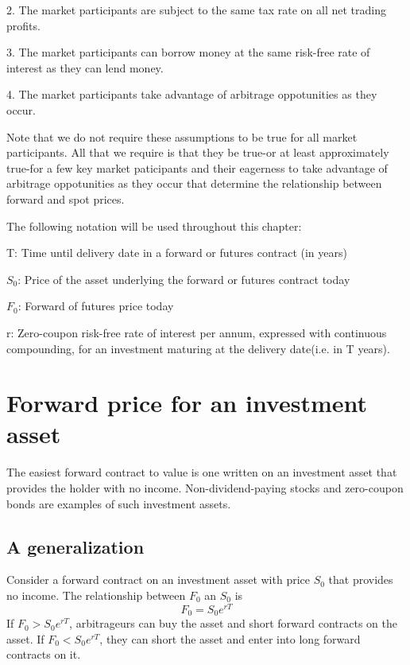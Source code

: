 \documentclass{article}
\begin{document}
2. The market participants are subject to the same tax rate on all net trading profits.

3. The market participants can borrow money at the same risk-free rate of interest as they can lend money.

4. The market participants take advantage of arbitrage oppotunities as they occur.
\\ \hspace*{\fill}

Note that we do not require these assumptions to be true for all market participants. All that we require is that they be true-or at least approximately true-for a few key market paticipants and their eagerness to take advantage of arbitrage oppotunities as they occur that determine the relationship between forward and spot prices.
\\ \hspace*{\fill}

The following notation will be used throughout  this chapter:

T: Time until delivery date in a forward or futures contract (in years)

$S_0$: Price of the asset underlying the forward or futures contract today

$F_0$: Forward of futures price today

r: Zero-coupon risk-free rate of interest per annum, expressed with continuous compounding, for an investment maturing at the delivery date(i.e. in T years).

\section{Forward price for an investment asset}
The easiest forward contract to value is one written on an investment asset that provides the holder with no income. Non-dividend-paying stocks and zero-coupon bonds are examples of such investment assets.

\subsection{A generalization}
Consider a forward contract on an investment asset with price $ S_0 $ that provides no income. The relationship between $ F_0 $ an $ S_0 $ is
\begin{equation}
	F_0=S_0e^{rT}
\end{equation}
If $ F_0>S_0e^{rT} $, arbitrageurs can buy the asset and short forward contracts on the asset. If $ F_0<S_0e^{rT} $, they can short the asset and enter into long forward contracts on it.
\end{document}
